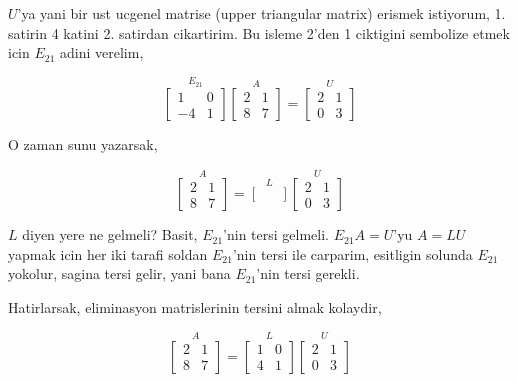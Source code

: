 \documentclass[12pt,fleqn]{article}\usepackage{../common}
\begin{document}
$U$'ya yani bir ust ucgenel matrise (upper triangular matrix) erismek
istiyorum, 1. satirin 4 katini 2. satirdan cikartirim. Bu isleme 2'den 
1 ciktigini sembolize etmek icin $E_{21}$ adini verelim, 

\[ 
\stackrel{E_{21}}{
\left[\begin{array}{rr}
1 & 0 \\ -4 & 1
\end{array}\right]
}
\stackrel{A}{
\left[\begin{array}{rr}
2 & 1 \\ 8 & 7
\end{array}\right]
}
=
\stackrel{U}{
\left[\begin{array}{rr}
2 & 1 \\ 0 & 3
\end{array}\right]
}
 \]

O zaman sunu yazarsak, 

\[ 
\stackrel{A}{
\left[\begin{array}{rr}
2 & 1 \\ 8 & 7
\end{array}\right]
}
=
\stackrel{L}{
\left[\begin{array}{rr}
 &  \\  & 
\end{array}\right]
}
\stackrel{U}{
\left[\begin{array}{rr}
2 & 1 \\ 0 & 3
\end{array}\right]
}
 \]

$L$ diyen yere ne gelmeli? Basit, $E_{21}$'nin tersi gelmeli. $E_{21}A =
U$'yu 
$A=LU $ yapmak icin her iki tarafi soldan $E_{21}$'nin tersi ile
carparim, esitligin solunda  $E_{21}$ yokolur, sagina tersi gelir, yani bana $E_{21}$'nin 
tersi gerekli. 

Hatirlarsak, eliminasyon matrislerinin tersini almak kolaydir,

\[ 
\stackrel{A}{
\left[\begin{array}{rr}
2 & 1 \\ 8 & 7
\end{array}\right]
}
=
\stackrel{L}{
\left[\begin{array}{rr}
1 & 0 \\ 4 & 1
\end{array}\right]
}
\stackrel{U}{
\left[\begin{array}{rr}
2 & 1 \\ 0 & 3
\end{array}\right]
}
 \]
\end{document}
